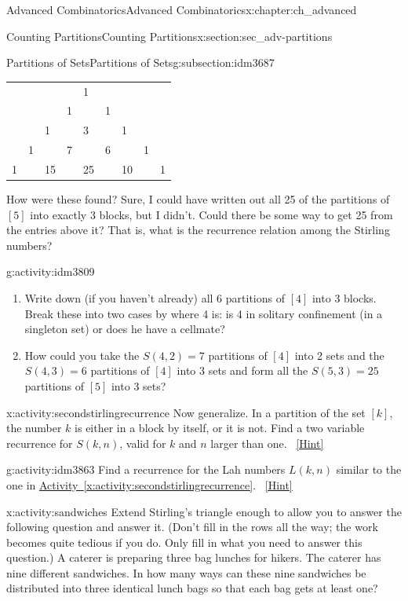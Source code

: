 \documentclass[oneside,10pt,]{book}
\numberwithin{equation}{chapter}
\begin{document}
\begin{chapterptx}{Advanced Combinatorics}{}{Advanced Combinatorics}{}{}{x:chapter:ch_advanced}
\begin{sectionptx}{Counting Partitions}{}{Counting Partitions}{}{}{x:section:sec_adv-partitions}
\begin{subsectionptx}{Partitions of Sets}{}{Partitions of Sets}{}{}{g:subsection:idm3687}
\begin{sidebyside}{1}{0.25}{0.25}{0}
\begin{sbspanel}{0.5}
{\centering%
\begin{tabular}{lllllllll}
&&&&1&&&&\tabularnewline[0pt]
&&&1&&1&&&\tabularnewline[0pt]
&&1&&3&&1&&\tabularnewline[0pt]
&1&&7&&6&&1&\tabularnewline[0pt]
1&&15&&25&&10&&1
\end{tabular}
\par}
\end{sbspanel}%
\end{sidebyside}%
\par
How were these found?  Sure, I could have written out all 25 of the partitions of \([5]\) into exactly \(3\) blocks, but I didn't.  Could there be some way to get 25 from the entries above it?  That is, what is the recurrence relation among the Stirling numbers?%
\begin{activity}{}{g:activity:idm3809}%
\begin{enumerate}[font=\bfseries,label=(\alph*),ref=\alph*]
\item{}Write down (if you haven't already) all 6 partitions of \([4]\) into \(3\) blocks.  Break these into two cases by where 4 is: is 4 in solitary confinement (in a singleton set) or does he have a cellmate?%
\item{}How could you take the \(S(4,2) = 7\) partitions of \([4]\) into 2 sets and the \(S(4,3) = 6\) partitions of \([4]\) into 3 sets and form all the \(S(5,3) = 25\) partitions of \([5]\) into \(3\) sets?%
\end{enumerate}
\end{activity}
\begin{activity}{}{x:activity:secondstirlingrecurrence}%
Now generalize.  In a partition of the set \([k]\), the number \(k\) is either in a block by itself, or it is not.  Find a two variable recurrence for \(S(k,n)\), valid for \(k\) and \(n\) larger than one.%
\qquad~\hfill{\tiny\hyperlink{g:hint:idm3833-back}{[Hint]}}\end{activity}
\begin{activity}{}{g:activity:idm3863}%
Find a recurrence for the Lah numbers \(L(k,n)\) similar to the one in \hyperref[x:activity:secondstirlingrecurrence]{Activity~\ref{x:activity:secondstirlingrecurrence}}.%
\qquad~\hfill{\tiny\hyperlink{g:hint:idm3868-back}{[Hint]}}\end{activity}
\begin{activity}{}{x:activity:sandwiches}%
Extend Stirling's triangle enough to allow you to answer the following question and answer it. (Don't fill in the rows all the way; the work becomes quite tedious if you do. Only fill in what you need to answer this question.) A caterer is preparing three bag lunches for hikers. The caterer has nine different sandwiches. In how many ways can these nine sandwiches be distributed into three identical lunch bags so that each bag gets at least one?%

\end{activity}
\end{subsectionptx}
\end{sectionptx}
\end{chapterptx}
\end{document}
